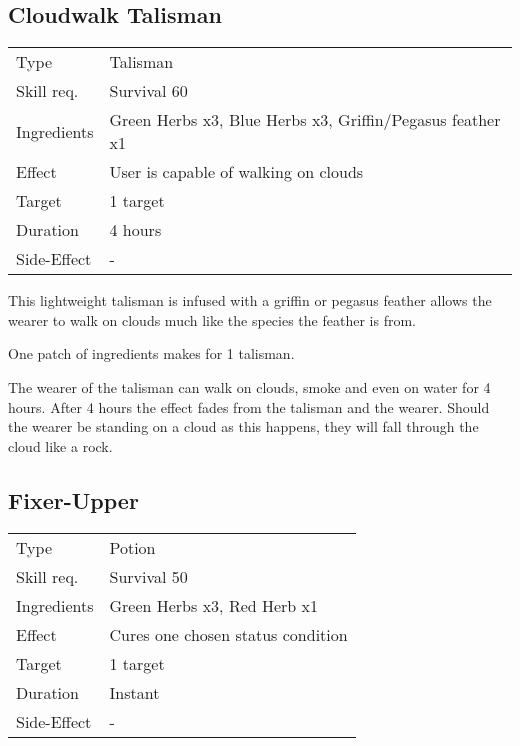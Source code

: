 \documentclass[11pt,a4paper,twocolumn]{book}
\begin{document}
\subsection*{Cloudwalk Talisman}
{
	\begin{tabu} to 75mm{| X[l,4] | X[l,8] |}
		\hline
		Type 			& Talisman 													\\
		Skill req.	    & Survival 60 												\\
		Ingredients     & Green Herbs x3, Blue Herbs x3, Griffin/Pegasus feather x1	\\
		Effect     		& User is capable of walking on clouds 						\\
		Target      	& 1 target													\\
		Duration  		& 4 hours	 												\\
		Side-Effect     & -															\\ \hline
	\end{tabu}
	
}

\medskip

This lightweight talisman is infused with a griffin or pegasus feather allows the wearer to walk on clouds much like the species the feather is from.

One patch of ingredients makes for 1 talisman.

The wearer of the talisman can walk on clouds, smoke and even on water for 4 hours. After 4 hours the effect fades from the talisman and the wearer. Should the wearer be standing on a cloud as this happens, they will fall through the cloud like a rock.

\vfill


\subsection*{Fixer-Upper}
{
	\begin{tabu} to 75mm{| X[l,4] | X[l,8] |}
		\hline
		Type 			& Potion													\\
		Skill req.	    & Survival 50 												\\
		Ingredients     & Green Herbs x3, Red Herb x1								\\
		Effect     		& Cures one chosen status condition 						\\
		Target      	& 1 target													\\
		Duration  		& Instant	 												\\
		Side-Effect     & -															\\ \hline
	\end{tabu}
	
}
\end{document}
